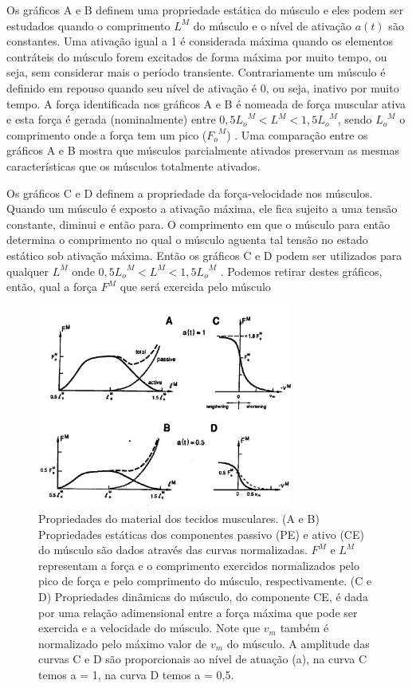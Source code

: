 Os gráficos A e B definem uma propriedade estática do músculo e eles podem ser estudados quando o comprimento $L^M$ do músculo e o nível de ativação $a(t)$ são constantes. Uma ativação igual a 1 é considerada máxima quando os elementos contráteis do músculo forem excitados de forma máxima por muito tempo, ou seja, sem considerar mais o período transiente. Contrariamente um músculo é definido em repouso quando seu nível de ativação é 0, ou seja, inativo por muito tempo. A força identificada nos gráficos A e B é nomeada de força muscular ativa e esta força é gerada (nominalmente) entre $0,5{L_o}^M < L^M < 1,5{L_o}^M$, sendo ${L_o}^M$ o comprimento onde a força tem um pico (${F_o}^M$) \cite{zajac1989muscle}. Uma comparação entre os gráficos A e B mostra que músculos parcialmente ativados preservam as mesmas características que os músculos totalmente ativados.

Os gráficos C e D definem a propriedade da força-velocidade nos músculos. Quando um músculo é exposto a ativação máxima, ele fica sujeito a uma tensão constante, diminui e então para. O comprimento em que o músculo para então determina o comprimento no qual o músculo aguenta tal tensão no estado estático sob ativação máxima. Então os gráficos C e D podem ser utilizados para qualquer $L^M$ onde $0,5{L_o}^M < L^M < 1,5{L_o}^M$ \cite{zajac1989muscle}. Podemos retirar destes gráficos, então, qual a força $F^M$ que será exercida pelo músculo 

\begin{figure}[H]
\centering
\includegraphics[width = 0.75\textwidth,angle=-90]{img/Zajac1989_Graficos.JPG}
\caption[Gráficos das propriedades força-comprimento e força-velocidade]{Propriedades do material dos tecidos musculares. (A e B) Propriedades estáticas
dos componentes passivo (PE) e ativo (CE) do músculo são dados através das curvas
normalizadas. $F^M$ e $L^M$ representam a força e o comprimento exercidos normalizados pelo
pico de força e pelo comprimento do músculo, respectivamente. (C e D) Propriedades
dinâmicas do músculo, do componente CE, é dada por uma relação adimensional entre
a força máxima que pode ser exercida e a velocidade do músculo. Note que $v_m$ também
é normalizado pelo máximo valor de $v_m$ do músculo. A amplitude das curvas C e D são
proporcionais ao nível de atuação (a), na curva C temos a = 1, na curva D temos a =
0,5.
\cite{zajac1989muscle}}
\label{graficos_zajac}
\end{figure}

